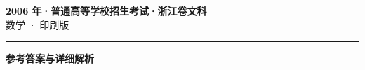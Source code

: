\documentclass[zihao=5, a4paper]{ctexart}
\begin{document}
\begin{center}
  {\Large\bfseries 2006 年·普通高等学校招生考试·浙江卷文科}\\[4pt]
  {\large 数学 · 印刷版}
\end{center}
\medskip
{}

\par\bigskip\hrule\bigskip
{}
\begin{center}{\large\bfseries 参考答案与详细解析}\end{center}
\smallskip

\end{document}
